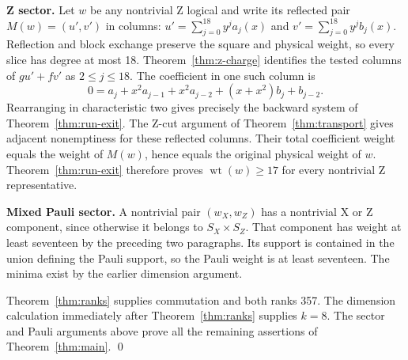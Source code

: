 \documentclass{article}
\DeclareMathOperator{\wt}{wt}
\begin{document}
\textbf{Z sector.} Let \(w\) be any nontrivial Z logical and write its reflected pair
\(M(w) = (u', v')\) in columns: \(u' = \sum_{j=0}^{18} y^j a_j(x)\) and
\(v' = \sum_{j=0}^{18} y^j b_j(x)\). Reflection and block exchange preserve the square and
physical weight, so every slice has degree at most 18. Theorem~\ref{thm:z-charge} identifies
the tested columns of \(g u' + f v'\) as \(2 \le j \le 18\). The coefficient in one such
column is
\begin{equation}
  0 = a_j + x^2 a_{j-1} + x^2 a_{j-2} + (x + x^2) b_j + b_{j-2}.
\end{equation}
Rearranging in characteristic two gives precisely the backward system of
Theorem~\ref{thm:run-exit}. The Z-cut argument of Theorem~\ref{thm:transport} gives adjacent
nonemptiness for these reflected columns. Their total coefficient weight equals the weight of
\(M(w)\), hence equals the original physical weight of \(w\). Theorem~\ref{thm:run-exit}
therefore proves \(\wt(w) \ge 17\) for every nontrivial Z representative.

\textbf{Mixed Pauli sector.} A nontrivial pair \((w_X, w_Z)\) has a nontrivial X or Z
component, since otherwise it belongs to \(S_X \times S_Z\). That component has weight at
least seventeen by the preceding two paragraphs. Its support is contained in the union
defining the Pauli support, so the Pauli weight is at least seventeen. The minima exist by the
earlier dimension argument.

Theorem~\ref{thm:ranks} supplies commutation and both ranks 357. The dimension calculation
immediately after Theorem~\ref{thm:ranks} supplies \(k = 8\). The sector and Pauli arguments
above prove all the remaining assertions of Theorem~\ref{thm:main}. \qed
\end{document}

